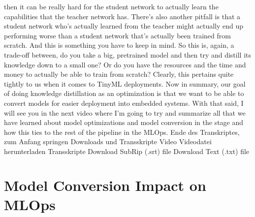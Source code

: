 {{{{{    then it can be really hard for the student network
    to actually learn the capabilities that the teacher network has.
    There's also another pitfall is that a student network who's actually
    learned from the teacher might actually end up
    performing worse than a student network that's
    actually been trained from scratch.
    And this is something you have to keep in mind.
    So this is, again, a trade-off between, do you take a big, pretrained model
    and then try and distill its knowledge down to a small one?
    Or do you have the resources and the time and money
    to actually be able to train from scratch?
    Clearly, this pertains quite tightly to us when it comes to TinyML deployments.
    Now in summary, our goal of doing knowledge distillation
    as an optimization is that we want to be able to convert models for easier
    deployment into embedded systems.
    With that said, I will see you in the next video
    where I'm going to try and summarize all that we have learned
    about model optimizations and model conversion in the stage
    and how this ties to the rest of the pipeline in the MLOps.
    Ende des Transkriptes, zum Anfang springen
    Downloads und Transskripte
    Video
    Videodatei herunterladen
    Transskripte
    Download SubRip (.srt) file
    Download Text (.txt) file 
 
\section{Model Conversion Impact on MLOps}

}}}}}
